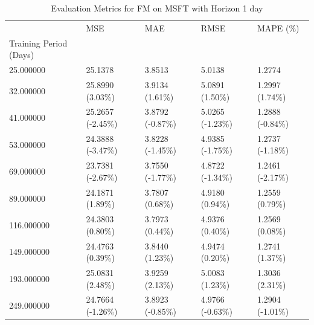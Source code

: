 \begin{table}
\caption{Evaluation Metrics for FM on MSFT with Horizon 1 day}
\label{tab:fm_MSFT_h1_metrics}
\begin{tabular}{lllll}
\toprule
 & MSE & MAE & RMSE & MAPE (\%) \\
Training Period (Days) &  &  &  &  \\
\midrule
25.000000 & 25.1378 & 3.8513 & 5.0138 & 1.2774 \\
32.000000 & 25.8990 (3.03\%) & 3.9134 (1.61\%) & 5.0891 (1.50\%) & 1.2997 (1.74\%) \\
41.000000 & 25.2657 (-2.45\%) & 3.8792 (-0.87\%) & 5.0265 (-1.23\%) & 1.2888 (-0.84\%) \\
53.000000 & 24.3888 (-3.47\%) & 3.8228 (-1.45\%) & 4.9385 (-1.75\%) & 1.2737 (-1.18\%) \\
69.000000 & 23.7381 (-2.67\%) & 3.7550 (-1.77\%) & 4.8722 (-1.34\%) & 1.2461 (-2.17\%) \\
89.000000 & 24.1871 (1.89\%) & 3.7807 (0.68\%) & 4.9180 (0.94\%) & 1.2559 (0.79\%) \\
116.000000 & 24.3803 (0.80\%) & 3.7973 (0.44\%) & 4.9376 (0.40\%) & 1.2569 (0.08\%) \\
149.000000 & 24.4763 (0.39\%) & 3.8440 (1.23\%) & 4.9474 (0.20\%) & 1.2741 (1.37\%) \\
193.000000 & 25.0831 (2.48\%) & 3.9259 (2.13\%) & 5.0083 (1.23\%) & 1.3036 (2.31\%) \\
249.000000 & 24.7664 (-1.26\%) & 3.8923 (-0.85\%) & 4.9766 (-0.63\%) & 1.2904 (-1.01\%) \\
\bottomrule
\end{tabular}
\end{table}
